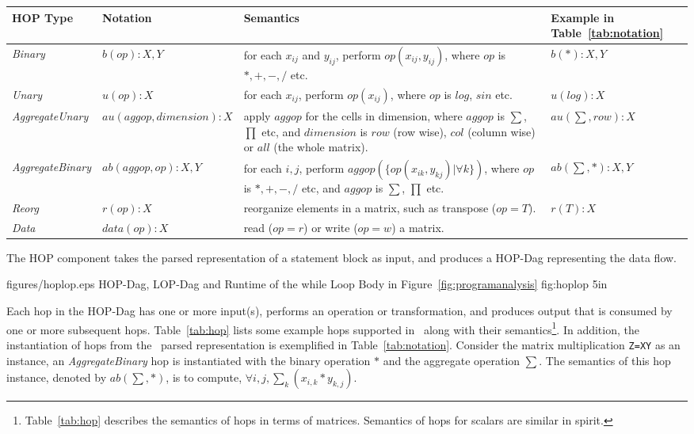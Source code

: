 \begin{table*}[t]
\centering
\caption{Example hops in SystemML: $x_{ij}$, $y_{ij}$ are cells in matrices $X$, $Y$, respectively.}
\label{tab:hop}
\begin{small}
\footnotesize
\begin{tabular}{|l|l|m{3.2in}|l|}
\hline
{\bf HOP Type} & {\bf Notation} & {\bf Semantics} & {\bf Example in Table~\ref{tab:notation}} \\
\hline
{\em Binary} &$b(op): X, Y$  & for each $x_{ij}$ and $y_{ij}$, perform $op(x_{ij}, y_{ij})$, where $op$ is $*, +, -, /$ etc. & $b(*): X, Y$ \\ \hline
{\em Unary} &$u(op): X$ & for each $x_{ij}$, perform $op(x_{ij})$, where $op$ is $log$, $sin$ etc. & $u(log): X$\\ \hline
{\em AggregateUnary}& $au(aggop, dimension): X$ & apply $aggop$ for the cells in dimension, where $aggop$ is $\sum$, $\prod$ etc, and $dimension$ is  
$row$ (row wise), $col$ (column wise) or $all$ (the whole matrix). & $au(\sum,row): X$\\ \hline
{\em AggregateBinary}& $ab(aggop, op): X, Y$ & for each $i,j$, perform $aggop(\{op(x_{ik}, y_{kj})| \forall k\})$, where $op$ is $*, +, -, /$ etc, and $aggop$ is 
$\sum$, $\prod$ etc. & $ab(\sum, *): X, Y$ \\  \hline
{\em Reorg} & $r(op): X$ & reorganize elements in a matrix, such as transpose ($op=T$). & $r(T): X$ \\ \hline
{\em Data} & $data(op): X$ & read ($op=r$) or write ($op=w$) a matrix. & \\ 
\hline
\end{tabular}
\end{small}
\SmallCrunch
\end{table*}

The HOP component takes the parsed representation of a statement block as input, and produces a HOP-Dag representing the data flow. 


\customizedfigInCol
{figures/hoplop.eps} 
{HOP-Dag, LOP-Dag and Runtime of the while Loop Body in Figure~\ref{fig:programanalysis}}
{fig:hoplop}
{5in}

Each hop in the HOP-Dag has one or more input(s), performs an operation or transformation, 
and produces output that is consumed by one or more subsequent hops. Table~\ref{tab:hop} 
lists some example hops supported in \systemmltext\ along with their 
semantics\footnote{Table~\ref{tab:hop} describes the semantics of hops in terms of 
matrices. Semantics of hops for scalars are similar in spirit.}. In addition, the instantiation of hops from the \dmlr\ parsed representation is exemplified in Table~\ref{tab:notation}. 
Consider the matrix multiplication \texttt{Z=X\mmult Y} as an instance, an {\em 
AggregateBinary} hop is instantiated with the binary operation $*$ and the aggregate operation $\sum$. The semantics of this hop instance, denoted by $ab(\sum,*)$, is to compute, $\forall i,j, \sum_k ({x_{i,k} * y_{k,j}})$. 


